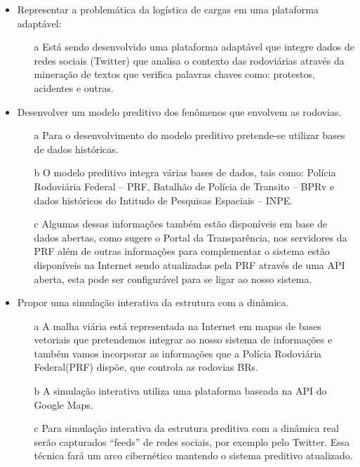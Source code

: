 \begin{itemize}
 \item Representar a problemática da logística de cargas em uma plataforma adaptável:
      \begin{itemize}
       \item[a] Está sendo desenvolvido uma plataforma adaptável que integre dados de redes sociais (Twitter) que analisa o contexto das rodoviárias através da mineração
       de textos que verifica palavras chaves como: protestos, acidentes e outras.
      \end{itemize}

 \item Desenvolver um modelo preditivo dos fenômenos que envolvem as rodovias.
      \begin{itemize}
       \item[a] Para o desenvolvimento do modelo preditivo pretende-se utilizar bases de dados históricas.
       \item[b] O modelo preditivo integra várias bases de dados, tais como: Polícia Rodoviária Federal -- PRF, Batalhão de Polícia de Transito -- BPRv e dados históricos 
       do Intitudo de Pesquisas Espaciais -- INPE.
       \item[c] Algumas dessas informações também estão disponíveis em base de dados abertas, como sugere o Portal da Transparência, nos servidores da PRF além de outras informações para complementar o sistema estão 
       disponíveis na Internet sendo atualizadas pela PRF através de uma API aberta, esta pode ser configurável para se ligar ao nosso sistema.
      \end{itemize}

 \item Propor uma simulação interativa da estrutura com a dinâmica.
      \begin{itemize}
       \item[a] A malha viária está representada na Internet em mapas de bases vetoriais que pretendemos integrar ao nosso sistema de informações e também vamos incorporar 
       as informações que a Polícia Rodoviária Federal(PRF) dispõe, que controla as rodovias BRs. 
       \item[b] A simulação interativa utiliza uma plataforma baseada na API do Google Maps.
       \item[c] Para simulação interativa da estrutura preditiva com a dinâmica real serão capturados ``feeds'' de redes sociais, por exemplo pelo Twitter. Essa técnica 
       fará um arco cibernético mantendo o sistema preditivo atualizado.
      \end{itemize}

\end{itemize}


